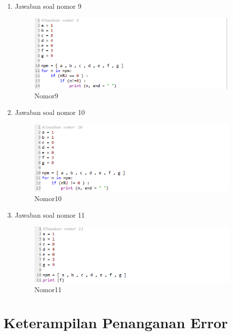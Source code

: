\begin{enumerate}
     \item Jawaban soal nomor 9
     \begin{figure}[!htbp]
        \centering
        \includegraphics[width=12cm]{figures/jwb9.PNG}
        \caption{Nomor9}
    \end{figure}
    
     \item Jawaban soal nomor 10
     \begin{figure}[!htbp]
        \centering
        \includegraphics[width=12cm]{figures/jwb10.PNG}
        \caption{Nomor10}
    \end{figure}
    \newpage
     \item Jawaban soal nomor 11
     \begin{figure}[!htbp]
        \centering
        \includegraphics[width=15cm]{figures/jwb11new.PNG}
        \caption{Nomor11}
    \end{figure}
\end{enumerate}
\section{Keterampilan Penanganan Error}
